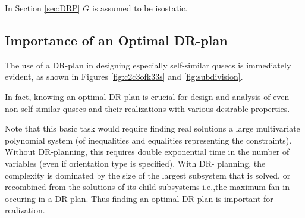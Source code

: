 





\noindent
\note In Section \ref{sec:DRP} $G$ is assumed to be isostatic.


\subsection{Importance of an Optimal DR-plan}
The use of a DR-plan in designing especially self-similar qusecs is
immediately evident, as shown in Figures \ref{fig:c2c3ofk33s} and
\ref{fig:subdivision}.

In fact, knowing an optimal DR-plan is crucial for
design and analysis of even non-self-similar qusecs and their
realizations with various desirable properties.

Note that this basic task
would require finding real solutions a large multivariate polynomial
system (of inequalities and equalities representing the constraints).
Without DR-planning, this requires double exponential time in the
number of variables (even if orientation type is specified). With DR-
planning, the complexity is dominated by the size of the largest
subsystem that is solved, or recombined from the solutions of its
child subsystems i.e.,the maximum fan-in occuring in a DR-plan. Thus
finding an optimal DR-plan is important for realization.

